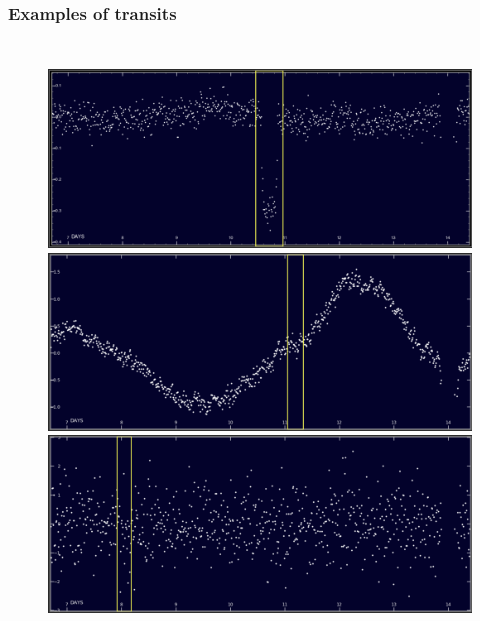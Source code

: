 \documentclass[aspectratio=169]{beamer}
\begin{document}
\begin{frame}
\frametitle{Examples of transits}
\begin{columns}[c]

\begin{figure}
\includegraphics[height=0.24\textheight]{img/zooniverse.org/obvious_transit.png}
\includegraphics[height=0.24\textheight]{img/zooniverse.org/shallow_transit.png}
\includegraphics[height=0.24\textheight]{img/zooniverse.org/stellar_variability_transit.png}
\captionsetup{labelformat=empty}
\end{figure}


\end{columns}
\end{frame}
\end{document}
